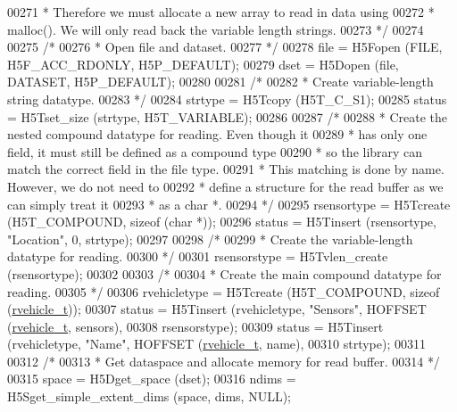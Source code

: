 \begin{DoxyCode}
00271 \textcolor{comment}{     * Therefore we must allocate a new array to read in data using}
00272 \textcolor{comment}{     * malloc().  We will only read back the variable length strings.}
00273 \textcolor{comment}{     */}
00274 
00275     \textcolor{comment}{/*}
00276 \textcolor{comment}{     * Open file and dataset.}
00277 \textcolor{comment}{     */}
00278     file = H5Fopen (FILE, H5F\_ACC\_RDONLY, H5P\_DEFAULT);
00279     dset = H5Dopen (file, DATASET, H5P\_DEFAULT);
00280 
00281     \textcolor{comment}{/*}
00282 \textcolor{comment}{     * Create variable-length string datatype.}
00283 \textcolor{comment}{     */}
00284     strtype = H5Tcopy (H5T\_C\_S1);
00285     status = H5Tset\_size (strtype, H5T\_VARIABLE);
00286 
00287     \textcolor{comment}{/*}
00288 \textcolor{comment}{     * Create the nested compound datatype for reading.  Even though it}
00289 \textcolor{comment}{     * has only one field, it must still be defined as a compound type}
00290 \textcolor{comment}{     * so the library can match the correct field in the file type.}
00291 \textcolor{comment}{     * This matching is done by name.  However, we do not need to}
00292 \textcolor{comment}{     * define a structure for the read buffer as we can simply treat it}
00293 \textcolor{comment}{     * as a char *.}
00294 \textcolor{comment}{     */}
00295     rsensortype = H5Tcreate (H5T\_COMPOUND, \textcolor{keyword}{sizeof} (\textcolor{keywordtype}{char} *));
00296     status = H5Tinsert (rsensortype, \textcolor{stringliteral}{"Location"}, 0, strtype);
00297 
00298     \textcolor{comment}{/*}
00299 \textcolor{comment}{     * Create the variable-length datatype for reading.}
00300 \textcolor{comment}{     */}
00301     rsensorstype = H5Tvlen\_create (rsensortype);
00302 
00303     \textcolor{comment}{/*}
00304 \textcolor{comment}{     * Create the main compound datatype for reading.}
00305 \textcolor{comment}{     */}
00306     rvehicletype = H5Tcreate (H5T\_COMPOUND, \textcolor{keyword}{sizeof} (\hyperlink{structrvehicle__t}{rvehicle\_t}));
00307     status = H5Tinsert (rvehicletype, \textcolor{stringliteral}{"Sensors"}, HOFFSET (\hyperlink{structrvehicle__t}{rvehicle\_t}, sensors),
00308                 rsensorstype);
00309     status = H5Tinsert (rvehicletype, \textcolor{stringliteral}{"Name"}, HOFFSET (\hyperlink{structrvehicle__t}{rvehicle\_t}, name),
00310                 strtype);
00311 
00312     \textcolor{comment}{/*}
00313 \textcolor{comment}{     * Get dataspace and allocate memory for read buffer.}
00314 \textcolor{comment}{     */}
00315     space = H5Dget\_space (dset);
00316     ndims = H5Sget\_simple\_extent\_dims (space, dims, NULL);

\end{DoxyCode}
